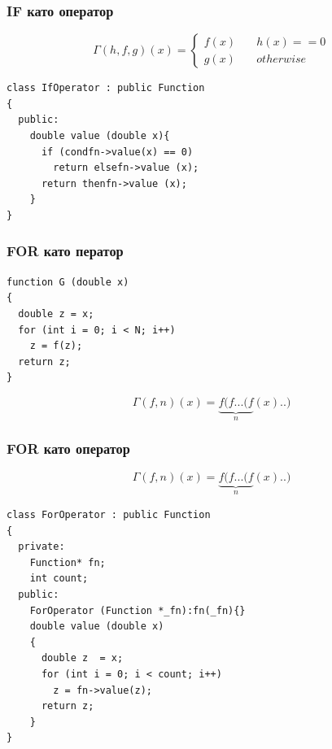\documentclass{beamer}
\begin{document}
\begin{frame}[fragile]
\frametitle{IF като оператор}

\begin{center}
$$
\Gamma(h,f,g)(x) = \left\{
        \begin{array}{ll}
            f(x) & \quad h(x) == 0 \\
            g(x) & \quad otherwise
        \end{array}
    \right.
$$


\begin{lstlisting}
class IfOperator : public Function
{
  public:
    double value (double x){
      if (condfn->value(x) == 0)
        return elsefn->value (x);
      return thenfn->value (x);
    }
}
\end{lstlisting}
  
\end{center}


\end{frame}



\begin{frame}[fragile]
\frametitle{FOR като ператор}

\begin{center}

\begin{lstlisting}
function G (double x)
{
  double z = x;
  for (int i = 0; i < N; i++)
    z = f(z);
  return z;
}
\end{lstlisting}
  
\end{center}


$$
\Gamma(f,n)(x) = \underbrace{f(f...(f}_n(x)..)
$$



\end{frame}




\begin{frame}[fragile]
\frametitle{FOR като оператор}

\begin{center}

$$
\Gamma(f,n)(x) = \underbrace{f(f...(f}_n(x)..)
$$



\begin{lstlisting}
class ForOperator : public Function
{
  private:
    Function* fn;
    int count;
  public:
    ForOperator (Function *_fn):fn(_fn){}
    double value (double x)
    {
      double z  = x;
      for (int i = 0; i < count; i++)
        z = fn->value(z);
      return z;
    }
}
\end{lstlisting}
  
\end{center}


\end{frame}
\end{document}
